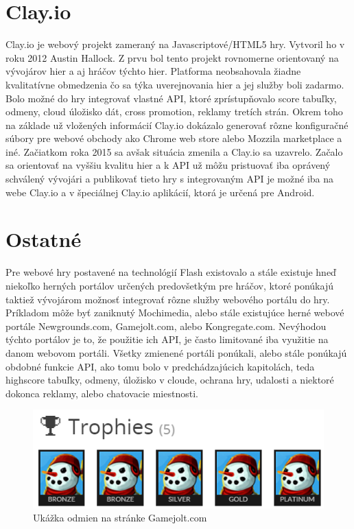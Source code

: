 \section{Clay.io}
Clay.io je webový projekt zameraný na Javascriptové/HTML5 hry. Vytvoril ho v roku 2012 Austin Hallock. Z prvu bol tento projekt rovnomerne orientovaný na vývojárov hier a aj hráčov týchto hier. Platforma neobsahovala žiadne kvalitatívne obmedzenia čo sa týka uverejnovania hier a jej služby boli zadarmo. Bolo možné do hry integrovať vlastné API, ktoré zprístupňovalo score tabuľky, odmeny, cloud úložisko dát, cross promotion, reklamy tretích strán. Okrem toho na základe už vložených informácií Clay.io dokázalo generovať rôzne konfiguračné súbory pre webové obchody ako Chrome web store alebo Mozzila marketplace a iné. Začiatkom roka 2015 sa avšak situácia zmenila a Clay.io sa uzavrelo. Začalo sa orientovať na vyššiu kvalitu hier a k API už môžu pristuovať iba oprávený schválený vývojári a publikovať tieto hry s integrovaným API je možné iba na webe Clay.io a v špeciálnej Clay.io aplikácií, ktorá je určená pre Android.    

\section{Ostatné}
Pre webové hry postavené na technológií Flash existovalo a stále existuje hneď niekoľko herných portálov určených predovšetkým pre hráčov, ktoré ponúkajú taktiež vývojárom možnosť integrovať rôzne služby webového portálu do hry. Príkladom môže byť zaniknutý Mochimedia, alebo stále existujúce herné webové portále Newgrounds.com, Gamejolt.com, alebo Kongregate.com. Nevýhodou týchto portálov je to, že použitie ich API, je často limitované iba využitie na danom webovom portáli. Všetky zmienené portáli ponúkali, alebo stále ponúkajú obdobné funkcie API, ako tomu bolo v predchádzajúcich kapitolách, teda highscore tabuľky, odmeny, úložisko v cloude, ochrana hry, udalosti a niektoré dokonca reklamy, alebo chatovacie miestnosti.
\begin{figure}[h]
  \centering
  \includegraphics[scale=0.5]{fig/odmeny2.png}
  \caption{Ukážka odmien na stránke Gamejolt.com}
  \label{fig:odmeny}
\end{figure}


